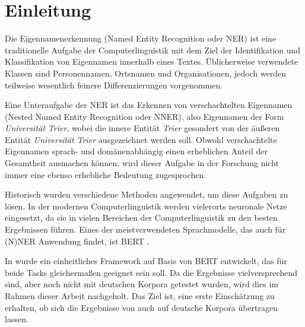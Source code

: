 

\chapter{Einleitung}
\label{ch:Einleitung}

Die Eigennamenerkennung (Named Entity Recognition oder NER) ist eine traditionelle Aufgabe der Computerlinguistik mit dem Ziel der Identifikation und Klassifikation von Eigennamen innerhalb eines Textes. Üblicherweise verwendete Klassen sind Personennamen, Ortsnamen und Organisationen, jedoch werden teilweise wesentlich feinere Differenzierungen vorgenommen.

Eine Unteraufgabe der NER ist das Erkennen von verschachtelten Eigennamen (Nested Named Entity Recognition oder NNER), also Eigennamen der Form \emph{Universität Trier}, wobei die innere Entität \emph{Trier} gesondert von der äußeren Entität \emph{Universität Trier} ausgezeichnet werden soll. Obwohl verschachtelte Eigennamen sprach- und domänenabhängig einen erheblichen Anteil der Gesamtheit ausmachen können, wird dieser Aufgabe in der Forschung nicht immer eine ebenso erhebliche Bedeutung zugesprochen.

Historisch wurden verschiedene Methoden angewendet, um diese Aufgaben zu lösen. In der modernen Computerlinguistik werden vielerorts neuronale Netze eingesetzt, da sie in vielen Bereichen der Computerlinguistik zu den besten Ergebnissen führen. Eines der meistverwendeten Sprachmodelle, das auch für (N)NER Anwendung findet, ist BERT \parencite{devlin2019bert}.

In \textcite{li2019unified} wurde ein einheitliches Framework auf Basis von BERT entwickelt, das für beide Tasks gleichermaßen geeignet sein soll. Da die Ergebnisse vielversprechend sind, aber noch nicht mit deutschen Korpora getestet wurden, wird dies im Rahmen dieser Arbeit nachgeholt. Das Ziel ist, eine erste Einschätzung zu erhalten, ob sich die Ergebnisse von  auch auf deutsche Korpora übertragen lassen.

